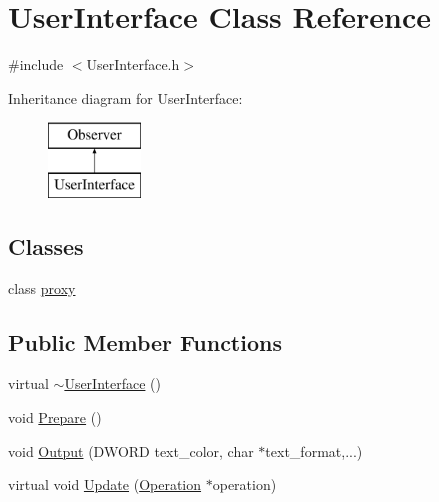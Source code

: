 \section{User\-Interface Class Reference}
\label{class_user_interface}


{\ttfamily \#include $<$User\-Interface.\-h$>$}

Inheritance diagram for User\-Interface\-:\begin{figure}[H]
\begin{center}
\leavevmode
\includegraphics[height=2.000000cm]{class_user_interface}
\end{center}
\end{figure}
\subsection*{Classes}
\begin{DoxyCompactItemize}
\item 
class \hyperlink{class_user_interface_1_1proxy}{proxy}
\end{DoxyCompactItemize}
\subsection*{Public Member Functions}
\begin{DoxyCompactItemize}
\item 
virtual \hyperlink{class_user_interface_a7b1a866c59dbeabdd3f9ae639bc88fad}{$\sim$\-User\-Interface} ()
\item 
void \hyperlink{class_user_interface_ac9707f0a64c99ca19cf07d757dae5433}{Prepare} ()
\item 
void \hyperlink{class_user_interface_a845c3810c8267134bb4d6502da3a271c}{Output} (D\-W\-O\-R\-D text\-\_\-color, char $\ast$text\-\_\-format,...)
\item 
virtual void \hyperlink{class_user_interface_a7f7df3c3de8a100dcadacb6bc4956302}{Update} (\hyperlink{class_operation}{Operation} $\ast$operation)
\end{DoxyCompactItemize}
